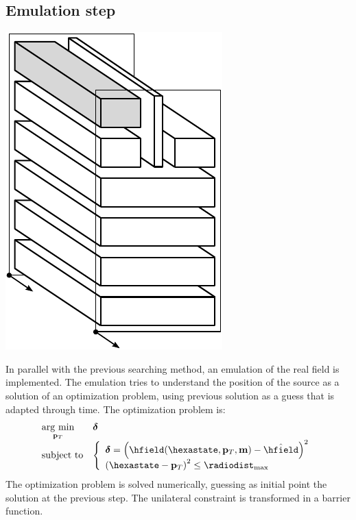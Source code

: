 \subsection{Emulation step}
\begin{marginfigure}
	\centering
	\includegraphics[scale=0.5]{ch3/img/PA_map_emulation.pdf}
\end{marginfigure}

In parallel with the previous searching method, an emulation of the real field is implemented. The emulation tries to understand the position of the source as a solution of an optimization problem, using previous solution as a guess that is adapted through time. The optimization problem is:
\begin{equation}
\begin{array}{ll}
\underset{\mathbf{p}_T}{\mathrm{arg~min}} & \boldsymbol{\delta} \\
\mathrm{subject~to} & 	\left\{ \begin{array}{l}
							\boldsymbol{\delta} = \braces{\hfield(\hexastate,\mathbf{p}_T, \mathbf{m}) - \hat{\hfield}}^2 \\
							\braces{\hexastate - \mathbf{p}_T}^2  \leq  {\radiodist_{\mathrm{max}}}
						\end{array} \right. \\ 
\end{array}
\end{equation}
The optimization problem is solved numerically, guessing as initial point the solution at the previous step. The unilateral constraint is transformed in a barrier function.

